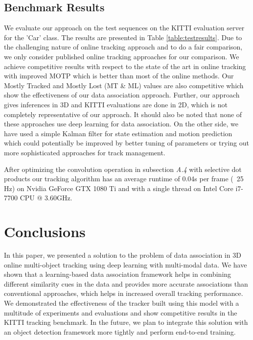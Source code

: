 \documentclass[letterpaper, 10 pt, conference]{ieeeconf}
\begin{document}
\subsection{Benchmark Results}
We evaluate our approach on the test sequences on the KITTI evaluation server for the 'Car' class. The results are presented in Table \ref{table:testresults}. Due to the challenging nature of online tracking approach and to do a fair comparison, we only consider published online tracking approaches for our comparison. We achieve competitive results with respect to the state of the art in online tracking with improved MOTP which is better than most of the online methods. Our Mostly Tracked and Mostly Lost (MT \& ML) values are also competitive which show the effectiveness of our data association approach. Further, our approach gives inferences in 3D and KITTI evaluations are done in 2D, which is not completely representative of our approach. It should also be noted that none of these approaches use deep learning for data association. On the other side, we have used a simple Kalman filter for state estimation and motion prediction which could potentially be improved by better tuning of parameters or trying out more sophisticated approaches for track management. 

After optimizing the convolution operation in subsection \textit{A.4} with selective dot products our tracking algorithm has an average runtime of 0.04s per frame (~25 Hz) on Nvidia GeForce GTX 1080 Ti and with a single thread on Intel Core i7-7700 CPU @ 3.60GHz.













\section{Conclusions}
In this paper, we presented a solution to the problem of data association in 3D online multi-object tracking using deep learning with multi-modal data. We have shown that a learning-based data association framework helps in combining different similarity cues in the data and provides more accurate associations than conventional approaches, which helps in increased overall tracking performance. We demonstrated the effectiveness of the tracker built using this model with a multitude of experiments and evaluations and show competitive results in the KITTI tracking benchmark. In the future, we plan to integrate this solution with an object detection framework more tightly and perform end-to-end training. 



{}
\end{document}
